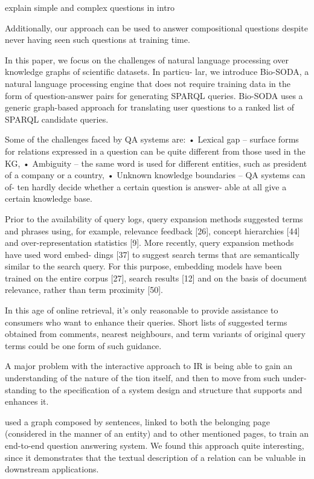  
 explain simple and complex questions in intro
 
 Additionally, our approach can be used to answer compositional questions despite never having seen such questions at training time.
 
 In this paper, we focus on the challenges of natural language processing over knowledge graphs of scientific datasets. In particu- lar, we introduce Bio-SODA, a natural language processing engine that does not require training data in the form of question-answer pairs for generating SPARQL queries. Bio-SODA uses a generic graph-based approach for translating user questions to a ranked list of SPARQL candidate queries.
 
 
 Some of the challenges faced by QA systems are:
• Lexical gap – surface forms for relations expressed in a question can be quite different from those used in the KG,
• Ambiguity – the same word is used for different entities, such as president of a company or a country,
• Unknown knowledge boundaries – QA systems can of- ten hardly decide whether a certain question is answer- able at all give a certain knowledge base. 

Prior to the availability of query logs, query expansion methods suggested terms and phrases using, for example, relevance feedback [26], concept hierarchies [44] and over-representation statistics [9]. More recently, query expansion methods have used word embed- dings [37] to suggest search terms that are semantically similar to the search query. For this purpose, embedding models have been trained on the entire corpus [27], search results [12] and on the basis of document relevance, rather than term proximity [50]. 


In this age of online retrieval, it's only reasonable to provide assistance to consumers who want to enhance their queries. Short lists of suggested terms obtained from comments, nearest neighbours, and term variants of original query terms could be one form of such guidance.


A major problem with the interactive approach to IR is being able to gain an understanding of the nature of the tion itself, and then to move from such under- standing to the specification of a system design and structure that supports and enhances it.

used a graph composed by sentences, linked to both the belonging page (considered in the manner of an entity) and to other mentioned pages, to train an end-to-end question answering system. We found this approach quite interesting, since it demonstrates that the textual description of a relation can be valuable in downstream applications. 
             
